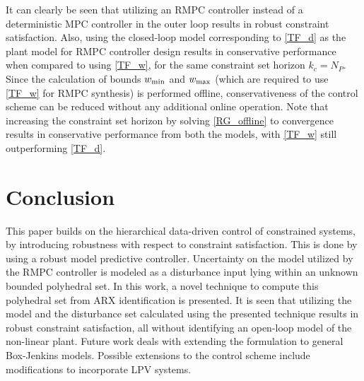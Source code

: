 \documentclass[letterpaper, 10 pt, conference]{ieeeconf}  %
\begin{document}
	It can clearly be seen that utilizing an RMPC controller instead of a deterministic MPC controller in the outer loop results in robust constraint satisfaction. Also, using the closed-loop model corresponding to \eqref{TF_d} as the plant model for RMPC controller design results in conservative performance when compared to using \eqref{TF_w}, for the same constraint set horizon $k_c = N_P$. Since the calculation of bounds $w_{\rm min}$ and $w_{\rm max}$ (which are required to use \eqref{TF_w} for RMPC synthesis) is performed offline, conservativeness of the control scheme can be reduced without any additional online operation. Note that increasing the constraint set horizon by solving \eqref{RG_offline} to convergence results in conservative performance from both the models, with \eqref{TF_w} still outperforming \eqref{TF_d}. 
	
	\section{Conclusion}
	This paper builds on the hierarchical data-driven control of constrained systems, by introducing robustness with respect to constraint satisfaction. This is done by using a robust model predictive controller.  Uncertainty on the model utilized by the RMPC controller is modeled as a disturbance input lying within an unknown bounded polyhedral set. 
	In this work, a novel technique to compute this polyhedral set from ARX identification is presented. It is seen that utilizing the model and the disturbance set calculated using the presented technique results in robust constraint satisfaction, all without identifying an open-loop model of the non-linear plant. Future work deals with extending the formulation to general Box-Jenkins models. Possible extensions to the control scheme include modifications to incorporate LPV systems.

	
                                                             

\end{document}
